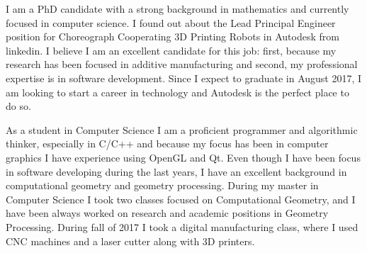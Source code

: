 \documentclass[10pt,stdletter,dateno,sigleft,letterpaper]{newlfm} %
\begin{document}
\begin{newlfm}



I am a PhD candidate with a strong background in mathematics and currently focused in computer science. I found out about the Lead Principal Engineer position for Choreograph Cooperating 3D Printing Robots in Autodesk from linkedin. I believe I am an excellent candidate for this job: first, because my research has been focused in additive manufacturing and second, my professional expertise is in software development. Since I expect to graduate in August 2017, I am looking to start a career in technology and Autodesk is the perfect place to do so.

As a student in Computer Science I am a proficient programmer and algorithmic thinker, especially in C/C++ and because my focus has been in computer graphics I have experience using OpenGL and Qt. Even though I have been focus in software developing during the last years, I have an excellent background in computational geometry and geometry processing. During my master in Computer Science I took two classes focused on Computational Geometry, and I have been always worked on research and academic positions in Geometry Processing. During fall of 2017 I took a digital manufacturing class, where I used CNC machines and a laser cutter along with 3D printers.


\end{newlfm}
\end{document}
